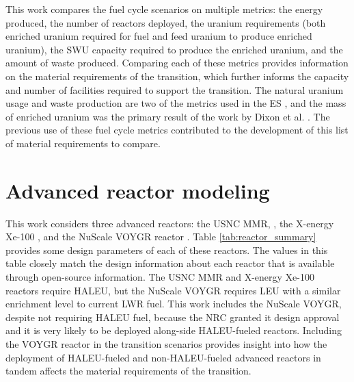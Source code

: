 This work compares the fuel cycle scenarios on multiple metrics: 
the energy produced, the number of reactors deployed, the 
uranium requirements (both enriched uranium required for fuel and feed uranium 
to produce enriched uranium), 
the \gls{SWU} capacity required to produce the enriched uranium, and the 
amount of waste produced. Comparing each of these metrics provides 
information on the material requirements of the transition, which further 
informs the capacity and number of facilities required to support 
the transition. The natural 
uranium usage and waste production are two of the metrics used in the 
\acrfull{ES} 
\cite{wigeland_nuclear_2014}, and the mass of enriched uranium was the 
primary result of the work by Dixon et al. \cite{dixon_estimated_2022}. 
The previous use of these fuel cycle metrics contributed to the development 
of this list of material requirements to compare.

\section{Advanced reactor modeling} \label{sec:reactor_methods}
This work considers three advanced reactors: the \gls{USNC} \gls{MMR}, 
\cite{mitchell_usnc_2020,noauthor_usnc_2021}, the X-energy Xe-100 
\cite{mulder_overview_2021}, and the NuScale VOYGR reactor
\cite{nuscale_chapter_2020-1,reyes_nuscale_2021,reyes_correction_2022}. 
Table \ref{tab:reactor_summary} provides some design parameters 
of each of these reactors. The values in this table closely match the 
design information about each reactor that is available through open-source 
information. The 
\gls{USNC} \gls{MMR} and X-energy Xe-100 reactors require \gls{HALEU}, 
but the NuScale VOYGR requires \gls{LEU} with a similar enrichment level 
to current \gls{LWR} fuel. This work 
includes the NuScale VOYGR, despite not requiring \gls{HALEU} fuel, 
because the \gls{NRC} granted it design approval \cite{world_nuclear_news_nuscale_2021} 
and it is very likely to be deployed along-side \gls{HALEU}-fueled 
reactors. Including the VOYGR reactor in the transition scenarios provides 
insight into how the deployment of \gls{HALEU}-fueled and non-\gls{HALEU}-fueled 
advanced reactors in tandem affects the material requirements of the transition. 

